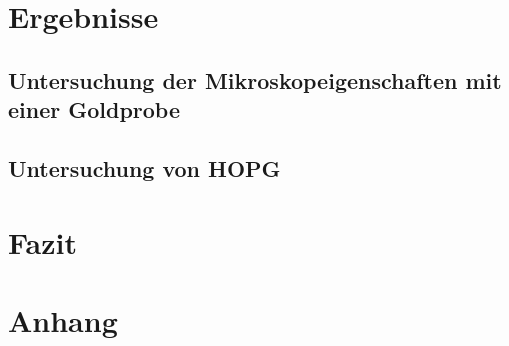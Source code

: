 \documentclass[12pt,a4paper]{article}
\begin{document}
\section{Ergebnisse}
\subsection{Untersuchung der Mikroskopeigenschaften mit einer Goldprobe}

\subsection{Untersuchung von HOPG}

\section{Fazit}

\section{Anhang}
\end{document}
